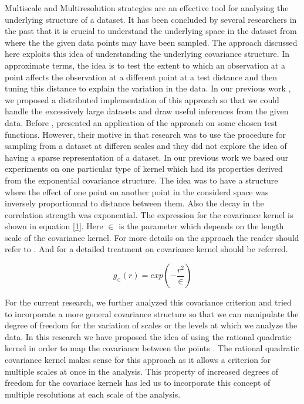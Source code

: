 \documentclass[procedia]{easychair}
\begin{document}
Multiscale and Multiresolution strategies are an effective tool for analysing the underlying structure of a dataset. It has been concluded by several researchers in the past that it is crucial to understand the underlying space in the dataset from where the the given data points may have been sampled. The approach discussed here exploits this idea of understanding the underlying  covariance structure. In approximate terms, the idea is to test the extent to which an observation at a point affects the observation at a  different point at a test distance and then tuning this distance to explain the variation in the data. In our previous work \cite{patra2016multilevel} , we proposed a distributed implementation of this approach so that we could handle the excessively large datasets and draw useful inferences from the given data. Before \cite{patra2016multilevel}, \cite{bermanis2013multiscale} presented an application of the approach on some chosen test functions. However, their motive in that research was to use the procedure for sampling from a dataset at differen scales and they did not explore the idea of having a sparse representation of a dataset. In our previous work we based our experiments on one particular type of kernel which had its properties derived from the exponential covariance structure. The idea was to have a structure where the effect of one point on another point in the considerd space was inversely proportionnal to distance between them. Also the decay in the correlation strength was exponential. The expression for the covariance kernel is shown in equation \ref{1}. Here $\in$ is the parameter which depends on the length scale of the covariance kernel. For more details on the approach the reader should refer to \cite{patra2016multilevel}. And for a detailed treatment on covariance kernel \cite{rasmussen2006gaussian} should be referred. 

\begin{equation}
g_\in (r) = exp\left({-\frac{r^2}{\in}}\right)
\label{1}
\end{equation}

For the current research, we further analyzed this covariance criterion and tried to incorporate a more general covariance structure so that we can manipulate the degree of freedom for the variation of scales or the levels at which we analyze the data. In this research we have proposed the idea of using the rational quadratic kernel in order to map the covariance between the points . The rational quadratic covariance kernel makes sense for this approach as it allows a criterion for multiple scales at once in the analysis. This property of increased degrees of freedom for the covariace kernels has led us to incorporate this concept of multiple resolutions at each scale of the analysis. 
\end{document}
